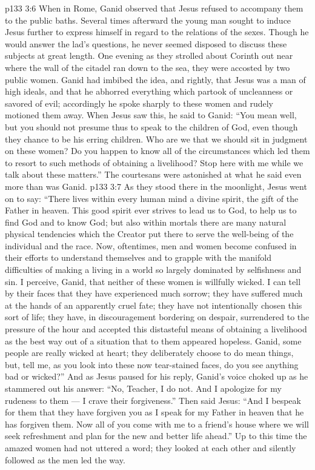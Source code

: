 \vs p133 3:6 When in Rome, Ganid observed that Jesus refused to accompany them to the public baths. Several times afterward the young man sought to induce Jesus further to express himself in regard to the relations of the sexes. Though he would answer the lad’s questions, he never seemed disposed to discuss these subjects at great length. One evening as they strolled about Corinth out near where the wall of the citadel ran down to the sea, they were accosted by two public women. Ganid had imbibed the idea, and rightly, that Jesus was a man of high ideals, and that he abhorred everything which partook of uncleanness or savored of evil; accordingly he spoke sharply to these women and rudely motioned them away. When Jesus saw this, he said to Ganid: \textcolor{ubdarkred}{“You mean well, but you should not presume thus to speak to the children of God, even though they chance to be his erring children. Who are we that we should sit in judgment on these women? Do you happen to know all of the circumstances which led them to resort to such methods of obtaining a livelihood? Stop here with me while we talk about these matters.”} The courtesans were astonished at what he said even more than was Ganid.
\vs p133 3:7 As they stood there in the moonlight, Jesus went on to say: \textcolor{ubdarkred}{“There lives within every human mind a divine spirit, the gift of the Father in heaven. This good spirit ever strives to lead us to God, to help us to find God and to know God; but also within mortals there are many natural physical tendencies which the Creator put there to serve the well\hyp{}being of the individual and the race. Now, oftentimes, men and women become confused in their efforts to understand themselves and to grapple with the manifold difficulties of making a living in a world so largely dominated by selfishness and sin. I perceive, Ganid, that neither of these women is willfully wicked. I can tell by their faces that they have experienced much sorrow; they have suffered much at the hands of an apparently cruel fate; they have not intentionally chosen this sort of life; they have, in discouragement bordering on despair, surrendered to the pressure of the hour and accepted this distasteful means of obtaining a livelihood as the best way out of a situation that to them appeared hopeless. Ganid, some people are really wicked at heart; they deliberately choose to do mean things, but, tell me, as you look into these now tear\hyp{}stained faces, do you see anything bad or wicked?”} And as Jesus paused for his reply, Ganid’s voice choked up as he stammered out his answer: “No, Teacher, I do not. And I apologize for my rudeness to them --- I crave their forgiveness.” Then said Jesus: \textcolor{ubdarkred}{“And I bespeak for them that they have forgiven you as I speak for my Father in heaven that he has forgiven them. Now all of you come with me to a friend’s house where we will seek refreshment and plan for the new and better life ahead.”} Up to this time the amazed women had not uttered a word; they looked at each other and silently followed as the men led the way.
